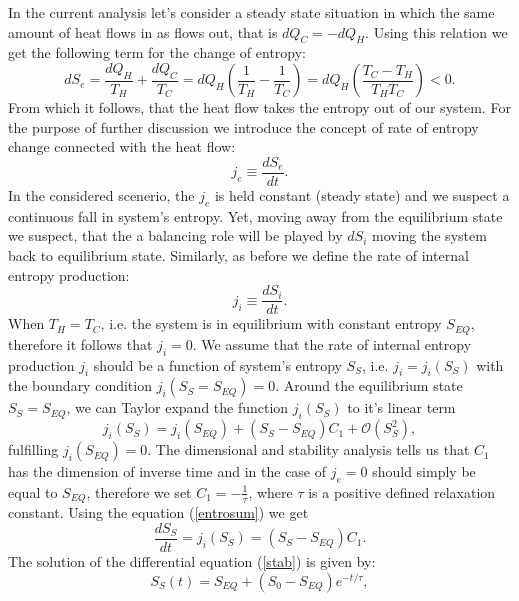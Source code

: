 \documentclass[a4paper,12pt]{article}
\begin{document}
In the current analysis let's consider a steady state situation in which the same amount of heat flows in as flows out, that is $dQ_C=-dQ_H$. Using this relation we get the following term for the change of entropy:
\begin{equation}
dS_e=\frac{dQ_H}{T_H}+\frac{dQ_C}{T_C}=dQ_H\left(\frac{1}{T_H}-\frac{1}{T_C}\right)
=dQ_H\left(\frac{T_C-T_H}{T_HT_C}\right)<0.
\label{dSe1}
\end{equation}
From which it follows, that the heat flow takes the entropy out of our system.
For the purpose of further discussion we introduce the concept of rate of entropy change connected with the heat flow:
\begin{equation}
j_e \equiv  \frac{dS_e}{dt}. 
\end{equation}
In the considered scenerio, the $j_e$ is held constant (steady state) and we suspect a continuous fall in system's entropy. Yet, moving away from the equilibrium state we suspect, that the a balancing role will be played by $dS_i$ moving the system back to equilibrium state. Similarly, as before we define the rate of internal entropy production:
\begin{equation}
j_i \equiv \frac{dS_i}{dt}.   
\end{equation} 
When $T_H=T_C$, i.e. the system is in equilibrium with constant entropy $S_{EQ}$, therefore it follows that $j_i=0$.
We assume that the rate of internal entropy production $j_i$ should be a function  of system's entropy $S_S$, i.e. $j_i = j_i(S_S)$ with the boundary condition $j_i(S_S=S_{EQ})=0$. Around the equilibrium state $S_S=S_{EQ}$, we can Taylor expand the function $j_i(S_S)$ to it's linear term
\begin{equation}
j_i(S_S)=j_i\left(S_{EQ}\right)+\left(S_S-S_{EQ}\right)C_1+\mathcal{O}\left(S_S^2\right),
\end{equation} 
fulfilling $j_i\left(S_{EQ}\right)=0$. The dimensional and stability analysis tells us that $C_1$ has the dimension of inverse time and in the case of 
$j_e=0$ should simply be equal to $S_{EQ}$, therefore we set $C_1 = -\frac{1}{\tau}$, where $\tau$ is a positive defined relaxation constant. Using the equation (\ref{entrosum}) we get
\begin{equation}
\label{stab}
\frac{dS_S}{dt}=j_i\left(S_S\right)=\left(S_S-S_{EQ}\right)C_1.
\end{equation} 
The solution of the differential equation (\ref{stab}) is given by:
\begin{equation}
S_S(t) =S_{EQ}+(S_0-S_{EQ})e^{-t/\tau}, 
\end{equation}
\end{document}
